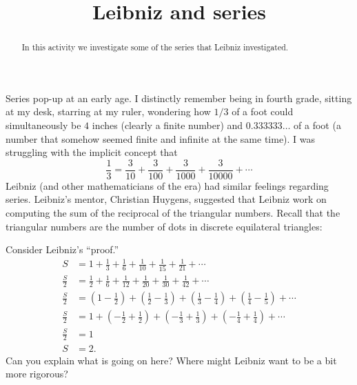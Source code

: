 \documentclass[nooutcomes]{ximera}
\title{Leibniz and series}
\begin{document}
\begin{abstract}
In this activity we investigate some of the series that Leibniz
investigated.
\end{abstract}
\maketitle


Series pop-up at an early age. I distinctly remember being in fourth
grade, sitting at my desk, starring at my ruler, wondering how $1/3$ of
a foot could simultaneously be $4$ inches (clearly a finite number) and
$0.333333\dots$ of a foot (a number that somehow seemed finite and
infinite at the same time). I was struggling with the implicit concept that 
\[
\frac{1}{3} = \frac{3}{10}+\frac{3}{100}+\frac{3}{1000}+\frac{3}{10000}+\cdots
\]
Leibniz (and other mathematicians of the era) had similar feelings regarding series. Leibniz's mentor, Christian Huygens, suggested that Leibniz work on computing the sum of the reciprocal of the triangular numbers. Recall that the triangular numbers are the number of dots in discrete equilateral triangles:
\begin{image}
\newlength\radius
\pgfmathsetlength{\radius}{0.2cm}
\newcommand\drawballs[2][]{%
    \foreach \y [evaluate=\y as \yy using #2+1-\y] in {1,...,#2} {%
        \foreach \x in {1,...,\yy} {%
            \shade[shading=ball,ball color=white,#1] 
                ({(2*\x-2+\y)*\radius},{sqrt(3)*\y*\radius}) circle (\radius); 
        };
    }%
}
\end{image}

\begin{question}
Consider Leibniz's ``proof.''
\begin{align*}
S &= 1+ \frac{1}{3} + \frac{1}{6} + \frac{1}{10} + \frac{1}{15} + \frac{1}{21} + \cdots\\
\frac{S}{2}&=\frac{1}{2} + \frac{1}{6} + \frac{1}{12} + \frac{1}{20} + \frac{1}{30}+\frac{1}{42} + \cdots\\
\frac{S}{2}&=\left(1-\frac{1}{2}\right) + \left(\frac{1}{2}-\frac{1}{3}\right) + \left(\frac{1}{3}-\frac{1}{4}\right) + \left(\frac{1}{4}-\frac{1}{5}\right) + \cdots\\
\frac{S}{2}&=1+\left(-\frac{1}{2} + \frac{1}{2}\right)+\left(-\frac{1}{3} + \frac{1}{3}\right)+\left(-\frac{1}{4} + \frac{1}{4}\right)+ \cdots\\
\frac{S}{2}&= 1\\
S &= 2.
\end{align*}
Can you explain what is going on here? Where might Leibniz want to be a bit more rigorous?
\end{question}
\end{document}
